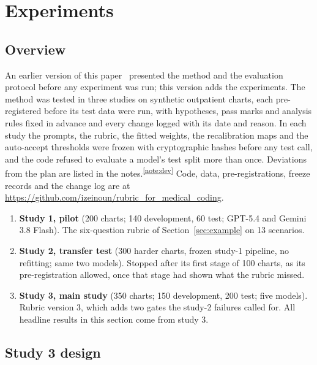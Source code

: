 \documentclass[10pt,letterpaper]{article}
\newcommand{\tnote}[1]{\textsuperscript{\hyperref[note:#1]{\ref*{note:#1}}}}
\begin{document}
\section{Experiments}\label{sec:experiments}

\FloatBarrier
\subsection{Overview}

An earlier version of this paper~\cite{ewc1} presented the method and the evaluation protocol before any experiment was run; this version adds the experiments. The method was tested in three studies on synthetic outpatient charts, each pre-registered before its test data were run, with hypotheses, pass marks and analysis rules fixed in advance and every change logged with its date and reason. In each study the prompts, the rubric, the fitted weights, the recalibration maps and the auto-accept thresholds were frozen with cryptographic hashes before any test call, and the code refused to evaluate a model's test split more than once. Deviations from the plan are listed in the notes.\tnote{dev} Code, data, pre-registrations, freeze records and the change log are at \url{https://github.com/izeinoun/rubric_for_medical_coding}.

\begin{enumerate}
  \item \textbf{Study 1, pilot} (200 charts; 140 development, 60 test; GPT-5.4 and Gemini 3.8 Flash). The six-question rubric of Section~\ref{sec:example} on 13 scenarios.
  \item \textbf{Study 2, transfer test} (300 harder charts, frozen study-1 pipeline, no refitting; same two models). Stopped after its first stage of 100 charts, as its pre-registration allowed, once that stage had shown what the rubric missed.
  \item \textbf{Study 3, main study} (350 charts; 150 development, 200 test; five models). Rubric version 3, which adds two gates the study-2 failures called for. All headline results in this section come from study 3.
\end{enumerate}

\FloatBarrier
\subsection{Study 3 design}
\end{document}
